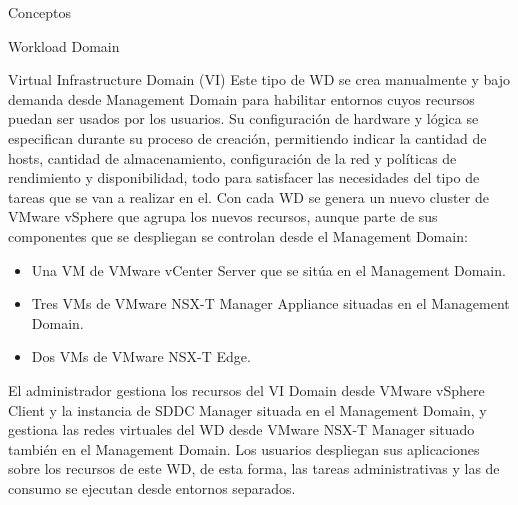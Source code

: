 \begin{section}{Conceptos}
\begin{subsection}{Workload Domain}
\begin{subsubsection}{Virtual Infrastructure Domain (VI)}
\label{subsubsec:domainVI}
Este tipo de WD se crea manualmente y bajo demanda desde Management Domain para habilitar entornos cuyos recursos puedan ser usados por los usuarios. Su configuración de hardware y lógica se especifican durante su proceso de creación, permitiendo indicar la cantidad de hosts, cantidad de almacenamiento, configuración de la red y políticas de rendimiento y disponibilidad, todo para satisfacer las necesidades del tipo de tareas que se van a realizar en el. Con cada WD se genera un nuevo cluster de VMware vSphere que agrupa los nuevos recursos, aunque parte de sus componentes que se despliegan se controlan desde el Management Domain:
\begin{itemize}
  \item Una VM de VMware vCenter Server que se sitúa en el Management Domain.
  \item Tres VMs de VMware NSX-T Manager Appliance situadas en el Management Domain.
  \item Dos VMs de VMware NSX-T Edge.
\end{itemize}
El administrador gestiona los recursos del VI Domain desde VMware vSphere Client y la instancia de SDDC Manager situada en el Management Domain, y gestiona las redes virtuales del WD desde VMware NSX-T Manager situado también en el Management Domain. Los usuarios despliegan sus aplicaciones sobre los recursos de este WD, de esta forma, las tareas administrativas y las de consumo se ejecutan desde entornos separados.


\end{subsubsection}
\end{subsection}
\end{section}
